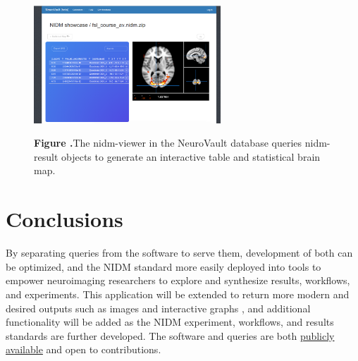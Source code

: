 \documentclass[twocolumn]{bmcart}%
\begin{document}
\begin{figure}[h!]
\begin{center}
\includegraphics[width=7cm]{img/figure1}
\end{center}
 \textbf{\label{fig:01}Figure .}{The nidm-viewer in the NeuroVault database queries nidm-result objects to generate an interactive table and statistical brain map.}
\end{figure}

\section{Conclusions}\label{conclusions}

By separating queries from the software to serve them, development of both can be optimized, and the NIDM standard more easily deployed into tools to empower neuroimaging researchers to explore and synthesize results, workflows, and experiments. This application will be extended to return more modern and desired outputs such as images and interactive graphs \cite{noauthor_undated-fs}, and additional functionality will be added as the NIDM experiment, workflows, and results standards are further developed. The software and queries are both \href{https://github.com/incf-nidash}{publicly available} and open to contributions.

\end{document}
